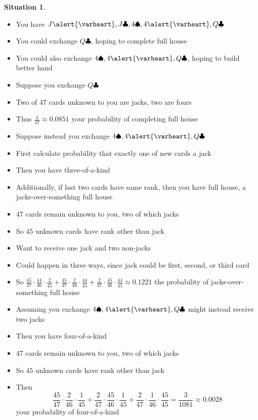 \documentclass[handout,xcolor=dvipsnames]{beamer}
\theoremstyle{definition}
\newtheorem{situation}{Situation}
\newcommand{\hs}{\alert{\varheart}}
\newcommand{\s}{\spadesuit}
\newcommand{\cs}{\clubsuit}
\begin{document}
\begin{frame}
\begin{situation}
\begin{itemize}
\item You have $J\hs,J\cs,4\s,4\hs,Q\cs$
\item You could exchange $Q\cs$, hoping to complete full house
\item You could also exchange $4\s,4\hs,Q\cs$, hoping to build better hand
\end{itemize}
\end{situation}
\begin{itemize}
\item Suppose you exchange $Q\cs$
\item Two of $47$ cards unknown to you are jacks, two are fours
\item Thus $\frac{4}{47}\approx 0.0851$ your probability
of completing full house
\end{itemize}
\end{frame}

\begin{frame}
\begin{itemize}
\item Suppose instead you exchange $4\s,4\hs,Q\cs$
\item First calculate probability that exactly one of new cards
a jack
\item Then you have three-of-a-kind
\item Additionally, if last two cards have same rank,
then you have full house, a \alert{jacks-over-something full house}
\item $47$ cards remain unknown to you, two of which jacks
\item So $45$ unknown cards have rank other than jack
\item Want to receive one jack and two non-jacks
\item Could happen in three ways, since jack could be
first, second, or third card
\item So $\frac{45}{47}\cdot\frac{44}{46}\cdot\frac{2}{45}
+\frac{45}{47}\cdot\frac{2}{46}\cdot\frac{44}{45}
+\frac{2}{47}\cdot\frac{45}{46}\cdot\frac{44}{45}\approx 0.1221$
the probability of jacks-over-something full house
\end{itemize}
\end{frame}

\begin{frame}
\begin{itemize}
\item Assuming you exchange $4\s,4\hs,Q\cs$
might instead receive \alert{two} jacks
\item Then you have four-of-a-kind
\item $47$ cards remain unknown to you, two of which jacks
\item So $45$ unknown cards have rank other than jack
\item Then \[\frac{45}{47}\cdot\frac{2}{46}\cdot\frac{1}{45}
+\frac{2}{47}\cdot\frac{45}{46}\cdot\frac{1}{45}
+\frac{2}{47}\cdot\frac{1}{46}\cdot\frac{45}{45}
=\frac{3}{1081}\approx 0.0028\]
your probability of four-of-a-kind
\end{itemize}
\end{frame}
\end{document}
